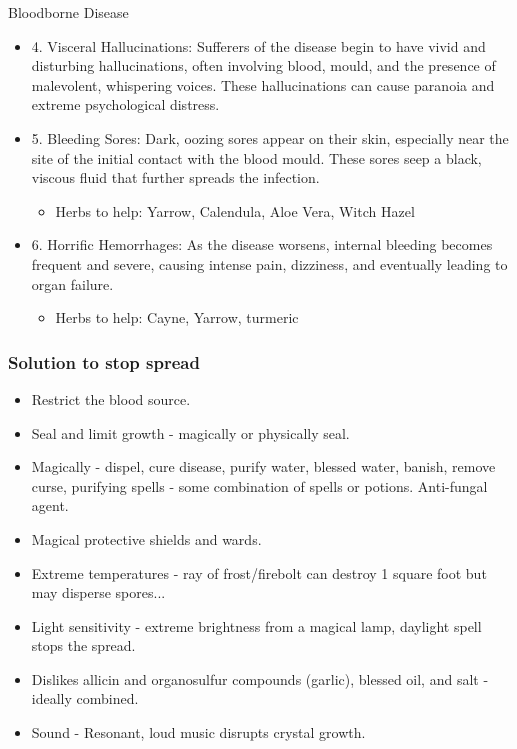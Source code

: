 \documentclass[10pt,onecolumn,twoside,openany,bg=full,layout=true]{dndbook}
\begin{document}
\begin{DndComment}{Bloodborne Disease}
\begin{itemize}
  \item 4. Visceral Hallucinations: Sufferers of the disease begin to have vivid and disturbing hallucinations, often involving blood, mould, and the presence of malevolent, whispering voices. These hallucinations can cause paranoia and extreme psychological distress.

  \item 5. Bleeding Sores: Dark, oozing sores appear on their skin, especially near the site of the initial contact with the blood mould. These sores seep a black, viscous fluid that further spreads the infection.


\begin{itemize}
\item Herbs to help: Yarrow, Calendula, Aloe Vera, Witch Hazel
\end{itemize}

\item 6. Horrific Hemorrhages: As the disease worsens, internal bleeding becomes frequent and severe, causing intense pain, dizziness, and eventually leading to organ failure.
\begin{itemize}
\item Herbs to help: Cayne, Yarrow, turmeric
\end{itemize}
\end{itemize}

\subsubsection*{Solution to stop spread}
\begin{itemize}
\item Restrict the blood source.
\item Seal and limit growth - magically or physically seal.
\item Magically - dispel, cure disease, purify water, blessed water, banish, remove curse, purifying spells - some combination of spells or potions. Anti-fungal agent.
\item Magical protective shields and wards.
\item Extreme temperatures - ray of frost/firebolt can destroy 1 square foot but may disperse spores...
\item Light sensitivity - extreme brightness from a magical lamp, daylight spell stops the spread.
\item Dislikes allicin and organosulfur compounds (garlic), blessed oil, and salt - ideally combined.
\item Sound - Resonant, loud music disrupts crystal growth.
\end{itemize}


\end{DndComment}
\end{document}
